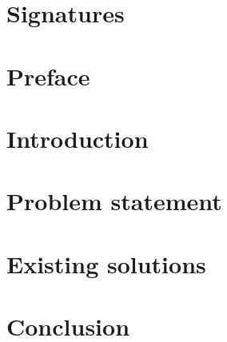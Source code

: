 






\thispagestyle{empty}
\cleardoublepage


\chapter*{Signatures}


\newpage
\thispagestyle{empty}
\mbox{}

\chapter*{Preface}
\thispagestyle{empty}


\newpage
\thispagestyle{empty}
\mbox{}

\newpage
\thispagestyle{empty}
\mbox{}

\setcounter{secnumdepth}{3}
\setcounter{tocdepth}{1}

\tableofcontents*

\acresetall %

\linenumbers %

\chapter{Introduction}\label{chap:intro}

\chapter{Problem statement}

\chapter{Existing solutions}




\chapter{Conclusion}
\label{chap:conclusion}

